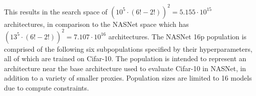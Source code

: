\documentclass[twocolumn]{article}
\begin{document}
This results in the search space of $(10^{5}\cdot(6! - 2!))^{2} = 5.155\cdot10^{15}$ architectures, in comparison to the NASNet\cite{nasnet} space which
has $(13^{5}\cdot(6! - 2!))^{2} = 7.107\cdot10^{16}$ architectures.
The NASNet 16p population is comprised of the following six subpopulations specified by their hyperparameters, all of which are trained on Cifar-10.
The population is intended to represent an architecture near the base architecture used to evaluate Cifar-10 in NASNet\cite{nasnet}, in addition to a variety of smaller
proxies. Population sizes are limited to 16 models due to compute constraints.

\begin{table}[!h]
    \begin{center}
        \caption{NASNet 16p Subpopulation Configurations}
        \label{table:nasnet_details}
    \end{center}
\end{table}
\end{document}

